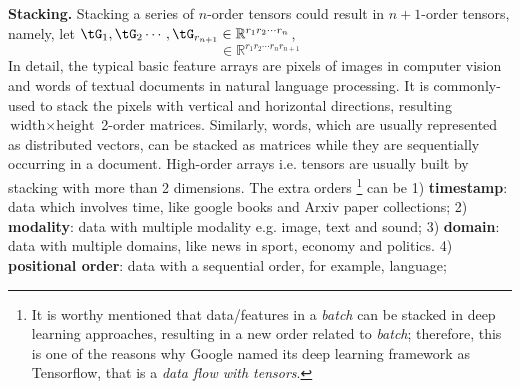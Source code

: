 \textbf{Stacking.} 
Stacking a series of $n$-order tensors could result in $n+1$-order tensors, namely, let $\tG_{1},\tG_{2} \cdots,\tG _{r_{n+1}} \in \mathbb{R}^{r_1 r_2 \cdots r_n}$,
\begin{equation}
[\tG_{1};\tG_{2} \cdots;\tG _{r_{n+1}} ] \in \mathbb{R}^{r_1 r_2 \cdots r_n r_{n+1}}
\end{equation}
In detail, the typical basic feature arrays  are  pixels of images in computer vision and  words of textual documents in natural language processing. It is commonly-used to stack the pixels with vertical and horizontal directions, resulting $\textrm{width} \times \textrm{height}$ 2-order matrices. Similarly, words, which are usually represented as distributed vectors, can be stacked as matrices while they are sequentially occurring in a document.
High-order arrays i.e. tensors are usually built by stacking with more than 2 dimensions. The extra orders \footnote{It is worthy mentioned that  data/features in a \textit{batch} can be stacked in deep learning approaches, resulting in a new order related to \textit{batch}; therefore, this is one of the reasons why Google named its deep learning framework as Tensorflow, that is a \textit{data flow with tensors}.} can be 1) \textbf{timestamp}: data which involves time, like google books and Arxiv paper collections; 2)  \textbf{modality}: data with multiple modality e.g. image, text and sound; 3) \textbf{domain}: data with multiple domains, like news in sport, economy and politics. 4)  \textbf{positional order}: data with a sequential order, for example, language;





